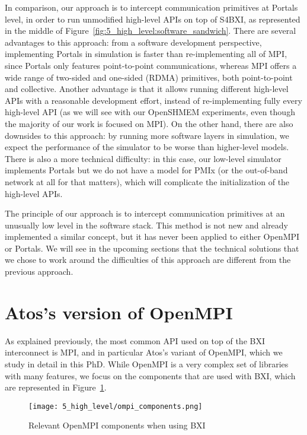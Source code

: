 In comparison, our approach is to intercept communication primitives at Portals
level, in order to run unmodified high-level APIs on top of S4BXI, as
represented in the middle of Figure~\ref{fig:5_high_level:software_sandwich}.
There are several advantages to this approach: from a software development
perspective, implementing Portals in simulation is faster than re-implementing
all of MPI, since Portals only features point-to-point communications, whereas
MPI offers a wide range of two-sided and one-sided (RDMA) primitives, both
point-to-point and collective. Another advantage is that it allows running
different high-level APIs with a reasonable development effort, instead of
re-implementing fully every high-level API (as we will see with our OpenSHMEM
experiments, even though the majority of our work is focused on MPI). On the
other hand, there are also downsides to this approach: by running more software
layers in simulation, we expect the performance of the simulator to be worse
than higher-level models. There is also a more technical difficulty: in this
case, our low-level simulator implements Portals but we do not have a model for
PMIx (or the out-of-band network at all for that matters), which will complicate
the initialization of the high-level APIs.

The principle of our approach is to intercept communication primitives at an unusually low level in the software
stack. This method is not new and \cite{Knight2018} already implemented a similar concept, but
it has never been applied to either OpenMPI or Portals. We will see in the
upcoming sections that the technical solutions that we chose to work around the
difficulties of this approach are different from the previous approach.

\section{Atos's version of OpenMPI}
\label{sec:5_high_level:atos_ompi}

As explained previously, the most common API used on top of the BXI interconnect
is MPI, and in particular Atos's variant of OpenMPI, which we study in detail in
this PhD. While OpenMPI is a very complex set of libraries with many features,
we focus on the components that are used with BXI, which are represented in
Figure~\ref{fig:5_high_level:ompi_components}.

\begin{figure}[!ht]
    \centering
    \texttt{[image: 5\_high\_level/ompi\_components.png]}
    \caption{Relevant OpenMPI components when using BXI}
    \label{fig:5_high_level:ompi_components}
\end{figure}

